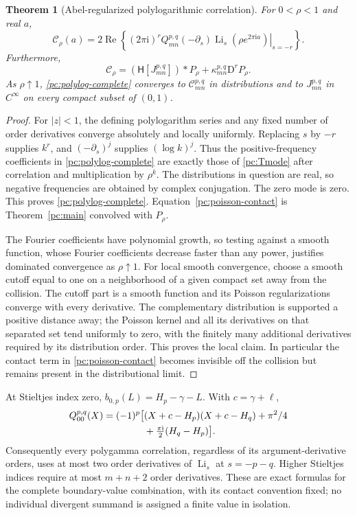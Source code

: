\documentclass[11pt,a4paper]{article}
\numberwithin{equation}{section}
\newtheorem{theorem}{Theorem}[section]
\theoremstyle{definition}
\newcommand{\ii}{\mathrm i}
\newcommand{\D}{\mathrm D}
\newcommand{\Li}{\operatorname{Li}}
\newcommand{\Rea}{\operatorname{Re}}
\newcommand{\HH}{\mathsf H}
\newcommand{\CC}{\mathcal C}
\begin{document}
\begin{theorem}[Abel-regularized polylogarithmic correlation]\label{pc:polylog}
For $0<\rho<1$ and real $a$,
\begin{equation}\label{pc:polylog-complete}
\CC_\rho(a)=2\Rea\left\{
(2\pi\ii)^r
\left.Q_{mn}^{p,q}(-\partial_s)
\Li_s(\rho e^{2\pi\ii a})\right|_{s=-r}
\right\}.
\end{equation}
Furthermore,
\begin{equation}\label{pc:poisson-contact}
\CC_\rho=(\HH[J_{mn}^{p,q}])*P_\rho
+\kappa_{mn}^{p,q}\D^rP_\rho.
\end{equation}
As $\rho\uparrow1$, \eqref{pc:polylog-complete} converges to $\CC_{mn}^{p,q}$ in distributions and to $J_{mn}^{p,q}$ in $C^\infty$ on every compact subset of $(0,1)$.
\end{theorem}
\begin{proof}
For $|z|<1$, the defining polylogarithm series and any fixed number of order derivatives converge absolutely and locally uniformly. Replacing $s$ by $-r$ supplies $k^r$, and $(-\partial_s)^j$ supplies $(\log k)^j$. Thus the positive-frequency coefficients in \eqref{pc:polylog-complete} are exactly those of \eqref{pc:Tmode} after correlation and multiplication by $\rho^k$. The distributions in question are real, so negative frequencies are obtained by complex conjugation. The zero mode is zero. This proves \eqref{pc:polylog-complete}. Equation~\eqref{pc:poisson-contact} is Theorem~\ref{pc:main} convolved with $P_\rho$.

The Fourier coefficients have polynomial growth, so testing against a smooth function, whose Fourier coefficients decrease faster than any power, justifies dominated convergence as $\rho\uparrow1$. For local smooth convergence, choose a smooth cutoff equal to one on a neighborhood of a given compact set away from the collision. The cutoff part is a smooth function and its Poisson regularizations converge with every derivative. The complementary distribution is supported a positive distance away; the Poisson kernel and all its derivatives on that separated set tend uniformly to zero, with the finitely many additional derivatives required by its distribution order. This proves the local claim. In particular the contact term in \eqref{pc:poisson-contact} becomes invisible off the collision but remains present in the distributional limit.
\end{proof}
At Stieltjes index zero, $b_{0,p}(L)=H_p-\gamma-L$. With $c=\gamma+\ell$,
\begin{align}
Q_{00}^{p,q}(X)=(-1)^p\big[&(X+c-H_p)(X+c-H_q)+\pi^2/4\notag\\
&+\tfrac{\pi\ii}{2}(H_q-H_p)\big].\label{pc:poly-Q}
\end{align}
Consequently every polygamma correlation, regardless of its argument-derivative orders, uses at most two order derivatives of $\Li_s$ at $s=-p-q$. Higher Stieltjes indices require at most $m+n+2$ order derivatives. These are exact formulas for the complete boundary-value combination, with its contact convention fixed; no individual divergent summand is assigned a finite value in isolation.
\end{document}
